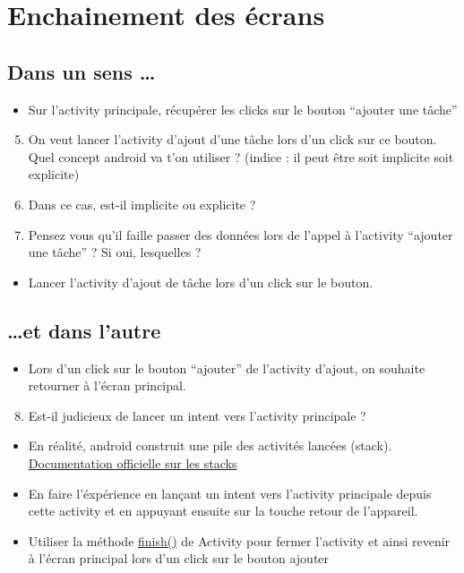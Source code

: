 \documentclass{article}
\begin{document}
\section{Enchainement des écrans}
\subsection{Dans un sens \ldots}
\begin{itemize}
  \item Sur l'activity principale, récupérer les clicks sur le bouton ``ajouter une tâche''
 \end{itemize}
\begin{enumerate}
 \setcounter{enumi}{4}
\item On veut lancer l'activity d'ajout d'une tâche lors d'un click sur ce bouton. Quel concept android va t'on utiliser ? 
(indice : il peut être soit implicite soit explicite)
\item Dans ce cas, est-il implicite ou explicite ?
\item Pensez vous qu'il faille passer des données lors de l'appel à l'activity ``ajouter une tâche'' ? Si oui, lesquelles ?
\end{enumerate}
\begin{itemize}
  \item Lancer l'activity d'ajout de tâche lors d'un click sur le bouton.
\end{itemize}
\subsection{\ldots et dans l'autre}

\begin{itemize}
  \item Lors d'un click sur le bouton ``ajouter'' de l'activity d'ajout, on souhaite retourner à l'écran principal.
 \end{itemize}
 \begin{enumerate}
 \setcounter{enumi}{7}
\item Est-il judicieux de lancer un intent vers l'activity principale ? 
\end{enumerate}
\begin{itemize}
  \item En réalité, android construit une pile des activités lancées (stack). \href{http://developer.android.com/guide/components/tasks-and-back-stack.html}{Documentation officielle sur les stacks} 
  \item En faire l'éxpérience en lançant un intent vers l'activity principale depuis cette activity et en appuyant ensuite sur la touche retour de l'appareil. 
  \item Utiliser la méthode \href{http://developer.android.com/reference/android/app/Activity.html#finish()}{finish()} de Activity pour fermer l'activity et ainsi revenir à l'écran principal lors d'un click sur le bouton ajouter 
 \end{itemize}
 
\end{document}
